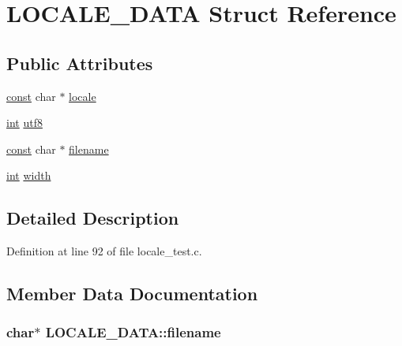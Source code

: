 \hypertarget{struct_l_o_c_a_l_e___d_a_t_a}{}\section{L\+O\+C\+A\+L\+E\+\_\+\+D\+A\+TA Struct Reference}
\label{struct_l_o_c_a_l_e___d_a_t_a}
\subsection*{Public Attributes}
\begin{DoxyCompactItemize}
\item 
\hyperlink{getopt1_8c_a2c212835823e3c54a8ab6d95c652660e}{const} char $\ast$ \hyperlink{struct_l_o_c_a_l_e___d_a_t_a_a35a1163ee48e9411e16a3ce0641af6c8}{locale}
\item 
\hyperlink{xmltok_8h_a5a0d4a5641ce434f1d23533f2b2e6653}{int} \hyperlink{struct_l_o_c_a_l_e___d_a_t_a_a39dd2912d4e98c3e1b8df9bcafc5feac}{utf8}
\item 
\hyperlink{getopt1_8c_a2c212835823e3c54a8ab6d95c652660e}{const} char $\ast$ \hyperlink{struct_l_o_c_a_l_e___d_a_t_a_a6e3c04baf58354527dd3b7152bfd14f7}{filename}
\item 
\hyperlink{xmltok_8h_a5a0d4a5641ce434f1d23533f2b2e6653}{int} \hyperlink{struct_l_o_c_a_l_e___d_a_t_a_a725251c86b1d5ae8df49afce9df16f78}{width}
\end{DoxyCompactItemize}


\subsection{Detailed Description}


Definition at line 92 of file locale\+\_\+test.\+c.



\subsection{Member Data Documentation}
\subsubsection[{\texorpdfstring{filename}{filename}}]{ char$\ast$ L\+O\+C\+A\+L\+E\+\_\+\+D\+A\+T\+A\+::filename}\hypertarget{struct_l_o_c_a_l_e___d_a_t_a_a6e3c04baf58354527dd3b7152bfd14f7}{}\label{struct_l_o_c_a_l_e___d_a_t_a_a6e3c04baf58354527dd3b7152bfd14f7}


